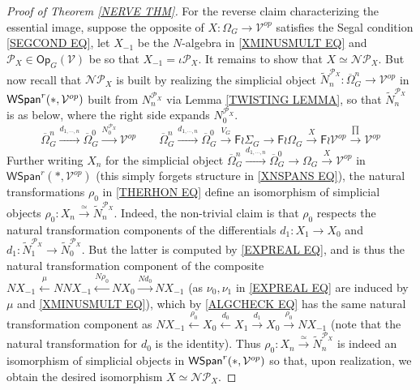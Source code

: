 \documentclass[a4paper,10pt
,draft
]{article}%
\numberwithin{equation}{section}
\numberwithin{figure}{section}
\theoremstyle{definition} %
\newcommand{\Fin}{\mathsf{F}}%
\newcommand{\1}{\ensuremath{\mathbbm 1}}%
\begin{document}
\begin{proof}[Proof of Theorem \ref{NERVE THM}]
For the reverse claim characterizing the essential image,
suppose the opposite of
$X \colon \Omega_G \to \mathcal{V}^{op}$
satisfies the Segal condition \eqref{SEGCOND EQ},
let $X_{-1}$ be the $N$-algebra in \eqref{XMINUSMULT EQ}
and $\mathcal{P}_X \in \mathsf{Op}_G(\mathcal{V})$
be so that $X_{-1} = \iota \mathcal{P}_X$.
It remains to show that
$X \simeq \mathcal{N} \mathcal{P}_X$.
But now recall that $\mathcal{N} \mathcal{P}_X$
is built by realizing the simplicial object
$\tilde{N}_n^{\mathcal{P}_X} \colon 
\overline{\Omega}^n_G \to \mathcal{V}^{op}$
in $\mathsf{WSpan}^r(\**,\mathcal{V}^{op})$
built from $N_n^{\mathcal{P}_X}$ via Lemma \ref{TWISTING LEMMA},
so that 
$\tilde{N}_n^{\mathcal{P}_X}$
is as below, where the right side expands $N_0^{\mathcal{P}_X}$.
\[
	\overline{\Omega}^{n}_G 
	\xrightarrow{d_{1,\cdots,n}}
	\overline{\Omega}^{0}_G \xrightarrow{N_0^{\mathcal{P}_X}}
	\mathcal{V}^{op}
\qquad
	\overline{\Omega}^{n}_G 
	\xrightarrow{d_{1,\cdots,n}}
	\overline{\Omega}^{0}_G \xrightarrow{V_G}
	\Fin \wr \Sigma_{G} \to 
	\Fin \wr \Omega_{G} \xrightarrow{X}
	\Fin \wr \mathcal{V}^{op} \xrightarrow{\prod}
	\mathcal{V}^{op}
\]
Further writing $X_n$ for the simplicial object 
$\overline{\Omega}^{n}_G 
\xrightarrow{d_{1,\cdots,n}}
\overline{\Omega}^{0}_G \to \Omega_G \xrightarrow{X}
\mathcal{V}^{op}$
in $\mathsf{WSpan}^r(*,\mathcal{V}^{op})$ 
(this simply forgets structure in \eqref{XNSPANS EQ}),
the natural transformations $\rho_0$ in \eqref{THERHON EQ}
define an isomorphism of simplicial objects
$\rho_0 \colon X_n \xrightarrow{\simeq} \tilde{N}_n^{\mathcal{P}_X}$.
Indeed, the non-trivial claim is that $\rho_0$ respects 
the natural transformation components of the differentials
$d_1\colon X_1 \to X_0$
and
$d_1\colon \tilde{N}_1^{\mathcal{P}_X} 
\to \tilde{N}_0^{\mathcal{P}_X}$.
But the latter is computed by 
\eqref{EXPREAL EQ}, and is thus the 
natural transformation component of the composite
$NX_{-1} \overset{\mu}{\leftarrow}
NNX_{-1} \overset{N \rho_0}{\leftarrow}
NX_0 \xrightarrow{Nd_0}
NX_{-1}$
(as $\nu_0, \nu_1$ in \eqref{EXPREAL EQ}
are induced by $\mu$ and 
\eqref{XMINUSMULT EQ}),
which by \eqref{ALGCHECK EQ}
has the same natural transformation component as
$NX_{-1} \overset{\rho_0}{\leftarrow}
X_0 \overset{d_0}{\leftarrow}
X_1 \xrightarrow{d_1}
X_0 \xrightarrow{\rho_0}
N X_{-1}$ 
(note that the natural transformation for $d_0$ is the identity).
Thus $\rho_0 \colon X_n \xrightarrow{\simeq} \tilde{N}_n^{\mathcal{P}_X}$
is indeed an isomorphism of simplicial objects in 
$\mathsf{WSpan}^r(\**,\mathcal{V}^{op})$ so that, 
upon realization,
we obtain the desired isomorphism
$X \simeq \mathcal{N} \mathcal{P}_X$.
\end{proof}
\end{document}
